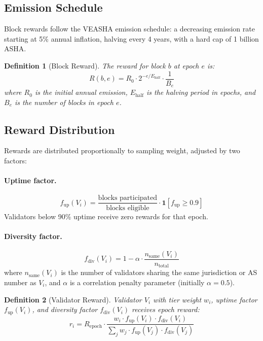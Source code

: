 \documentclass[11pt,a4paper]{article}
\newtheorem{definition}{Definition}[section]
\begin{document}
\subsection{Emission Schedule}

Block rewards follow the VEASHA emission schedule: a decreasing emission
rate starting at 5\% annual inflation, halving every 4 years, with a
hard cap of 1 billion ASHA.

\begin{definition}[Block Reward]
    The reward for block $b$ at epoch $e$ is:
    \[
        R(b, e) = R_0 \cdot 2^{-e/E_{\mathrm{half}}} \cdot \frac{1}{B_e}
    \]
    where $R_0$ is the initial annual emission, $E_{\mathrm{half}}$ is
    the halving period in epochs, and $B_e$ is the number of blocks in
    epoch $e$.
\end{definition}

\subsection{Reward Distribution}

Rewards are distributed proportionally to sampling weight, adjusted by
two factors:

\paragraph{Uptime factor.}
\[
    f_{\mathrm{up}}(V_i) = \frac{\text{blocks participated}}{
    \text{blocks eligible}} \cdot \mathbf{1}[
    f_{\mathrm{up}} \geq 0.9]
\]
Validators below 90\% uptime receive zero rewards for that epoch.

\paragraph{Diversity factor.}
\[
    f_{\mathrm{div}}(V_i) = 1 - \alpha \cdot \frac{
    n_{\mathrm{same}}(V_i)}{n_{\mathrm{total}}}
\]
where $n_{\mathrm{same}}(V_i)$ is the number of validators sharing
the same jurisdiction or AS number as $V_i$, and $\alpha$ is a
correlation penalty parameter (initially $\alpha = 0.5$).

\begin{definition}[Validator Reward]
    Validator $V_i$ with tier weight $w_i$, uptime factor
    $f_{\mathrm{up}}(V_i)$, and diversity factor $f_{\mathrm{div}}(V_i)$
    receives epoch reward:
    \[
        r_i = R_{\mathrm{epoch}} \cdot
        \frac{w_i \cdot f_{\mathrm{up}}(V_i) \cdot f_{\mathrm{div}}(V_i)}{
        \sum_j w_j \cdot f_{\mathrm{up}}(V_j) \cdot f_{\mathrm{div}}(V_j)}
    \]
\end{definition}
\end{document}
